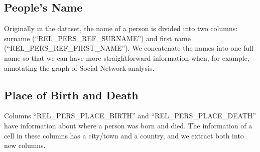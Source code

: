 \documentclass[12pt,a4paper,oneside]{book}
\begin{document}
\begin{sloppypar}
\subsection*{People's Name}
Originally in the dataset, the name of a person is divided into two columns: surname (“REL\_PERS\_REF\_SURNAME”) and first name (“REL\_PERS\_REF\_FIRST\_NAME”). We concatenate the names into one full name so that we can have more straightforward information when, for example, annotating the graph of Social Network analysis.

\subsection*{Place of Birth and Death}
Columns “REL\_PERS\_PLACE\_BIRTH” and “REL\_PERS\_PLACE\_DEATH” have information about where a person was born and died. The information of a cell in these columns has a city/town and a country, and we extract both into new columns.

\begin{table}[H]
\centering
\caption{Examples of Extracting Birth/Death Place}
\label{tab:extractPlace}
\end{table}


\end{sloppypar}
\end{document}
